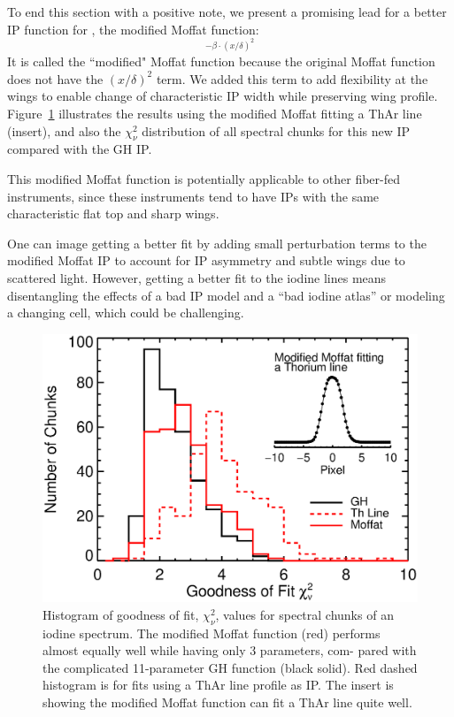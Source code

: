 To end this section with a positive note, we present a promising lead
for a better IP function for \hrs, the modified Moffat function:
\begin{equation}
[1+(x/\theta)^2]^{-\beta\cdot(x/\delta)^2}
\end{equation} 
It is called the ``modified" Moffat function because the original
Moffat function does not have the $(x/\delta)^2$ term. We added this
term to add flexibility at the wings to enable change of characteristic
IP width while preserving wing profile. Figure~\ref{het:fig:moffat}
illustrates the results using the modified Moffat fitting a ThAr line
(insert), and also the $\chi^2_\nu$ distribution of all spectral
chunks for this new IP compared with the GH IP. 

This modified Moffat function is potentially applicable to other
fiber-fed instruments, since these instruments tend to have IPs with
the same characteristic flat top and sharp wings.

One can image getting a better fit by adding small perturbation terms to the
modified Moffat IP to account for IP asymmetry and subtle wings due to
scattered light. However, getting a better fit to the iodine lines means
disentangling the effects of a bad IP model and a ``bad iodine atlas''
or modeling a changing cell, which could be challenging.



\begin{figure}
\centering
\includegraphics[scale=0.45]{het/thar_vs_moffat.eps}
\caption{Histogram of goodness of fit, $\chi^2_\nu$, values for
  spectral chunks of an iodine spectrum. The modified Moffat function
  (red) performs almost equally well while having only 3 parameters,
  com- pared with the complicated 11-parameter GH function (black
  solid). Red dashed histogram is for fits using a ThAr line profile
  as IP. The insert is showing the modified Moffat function can fit a
  ThAr line quite well.
\label{het:fig:moffat}}
\end{figure}


